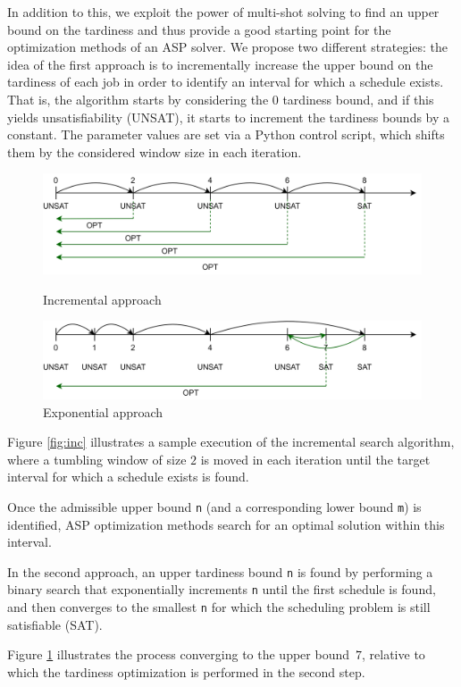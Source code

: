 \documentclass[submission,copyright,creativecommons]{eptcs}
\begin{document}
In addition to this, we exploit the power of multi-shot solving to find an upper bound on the tardiness and thus provide a good starting point for the optimization methods of an ASP solver. 
We propose two different strategies: the idea of the first approach is to incrementally increase the upper bound on the tardiness of each job in order to identify an interval for which a schedule exists.
%
That is, the algorithm starts by considering the $0$ tardiness bound, and if this yields unsatisfiability (UNSAT), it starts to increment the tardiness bounds by a constant. The parameter values are set via a Python control script, which shifts them by the considered window size in each iteration. 

\begin{figure}[b]
	\centering
	\includegraphics[width=0.7\linewidth]{figures/incremental.pdf}
	\caption{Incremental approach \label{fig:inc}}
        \smallskip %
        \bigskip
	\includegraphics[width=0.7\linewidth]{figures/exponential.pdf}
	\caption{Exponential approach \label{fig:exp}}
\end{figure}

Figure \ref{fig:inc} illustrates a sample execution of the incremental search algorithm, where a tumbling window of size $2$ is moved in each iteration until the target interval for which a schedule exists is found. 

Once the admissible upper bound \lstinline{n} (and a corresponding lower bound \lstinline{m}) is identified, ASP optimization methods search for an optimal solution within this interval.

In the second approach, an upper tardiness bound \lstinline{n} is found by performing a binary search that exponentially increments \lstinline{n} until the first schedule is found, and then converges to the smallest \lstinline{n} for which the scheduling problem is still satisfiable (SAT).

Figure \ref{fig:exp} illustrates the process converging to the upper bound~$7$,
relative to which the tardiness optimization is performed in the second step.
\end{document}
